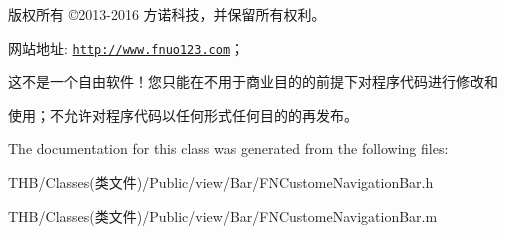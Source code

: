版权所有 ©2013-\/2016 方诺科技，并保留所有权利。

网站地址\+: \href{http://www.fnuo123.com}{\tt http\+://www.\+fnuo123.\+com}； 



这不是一个自由软件！您只能在不用于商业目的的前提下对程序代码进行修改和

使用；不允许对程序代码以任何形式任何目的的再发布。 

 

The documentation for this class was generated from the following files\+:\begin{DoxyCompactItemize}
\item 
T\+H\+B/\+Classes(类文件)/\+Public/view/\+Bar/F\+N\+Custome\+Navigation\+Bar.\+h\item 
T\+H\+B/\+Classes(类文件)/\+Public/view/\+Bar/F\+N\+Custome\+Navigation\+Bar.\+m\end{DoxyCompactItemize}
